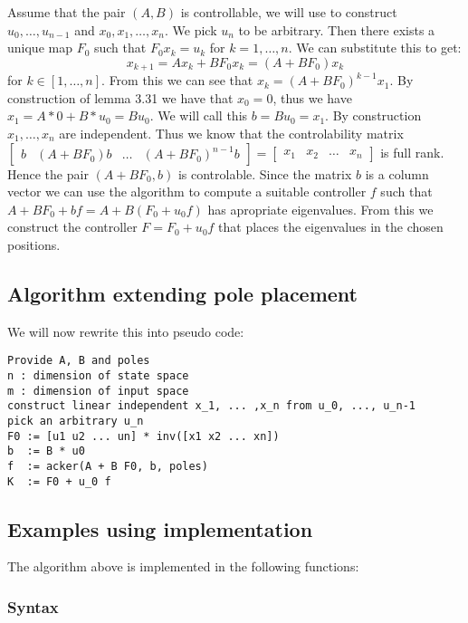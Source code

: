 
Assume that the pair $(A,B)$ is controllable, we will use \cite[Lemma 3.31]{bookTrentelman} to construct $u_0, \dots , u_{n-1}$ and $x_0,x_1, \dots ,x_n$. We pick $u_n$ to be arbitrary. Then there exists a unique map $F_0$ such that $F_0 x_k = u_k$ for $k = 1,\dots,n$. We can substitute this to get:
\[ x_{k+1} = Ax_k + BF_0 x_k = (A + BF_0 ) x_k \]
for $k \in [1, \dots, n]$. From this we can see that $x_k = (A+BF_0)^{k-1} x_1$. By construction of lemma 3.31 we have that $x_0 = 0$, thus we have $x_1 = A * 0 + B * u_0 = Bu_0$. We will call this $b = Bu_0 = x_1$. By construction $x_1,\dots,x_n$ are independent. Thus we know that the controlability matrix $\begin{bmatrix}b&(A+BF_0)b&\dots&(A+BF_0)^{n-1}b\end{bmatrix} = \begin{bmatrix}x_1&x_2&\dots&x_n\end{bmatrix}$ is full rank. Hence the pair $(A+BF_0,b)$ is controlable. Since the matrix $b$ is a column vector we can use the  algorithm to compute a suitable controller $f$ such that $A+BF_0 + bf = A + B(F_0 + u_0 f)$ has apropriate eigenvalues. From this we construct the controller $F = F_0 + u_0 f$ that places the eigenvalues in the chosen positions.

\subsection{Algorithm extending pole placement}
We will now rewrite this into pseudo code:
\begin{lstlisting}
Provide A, B and poles
n : dimension of state space
m : dimension of input space
construct linear independent x_1, ... ,x_n from u_0, ..., u_n-1
pick an arbitrary u_n
F0 := [u1 u2 ... un] * inv([x1 x2 ... xn])
b  := B * u0
f  := acker(A + B F0, b, poles)
K  := F0 + u_0 f
\end{lstlisting}

\subsection{Examples using implementation}
The algorithm above is implemented in the following functions:
\subsubsection*{Syntax}

